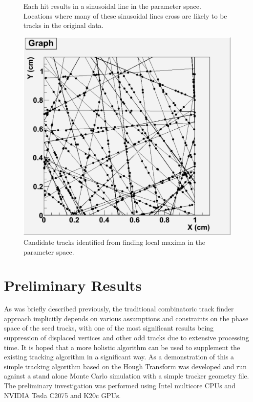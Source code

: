 \documentclass{JINST}
\begin{document}
\begin{figure}[!Hhtb]
\begin{minipage}[t]{4.9cm}
\begin{center}
	\caption{Each hit results in a sinusoidal line in the parameter space.  Locations where many 
of these sinusoidal lines cross are likely to be tracks in the original data.  \label{fig:accumulator}}
	\end{center}
\end{minipage}
\begin{minipage}[t]{4.9cm}
\begin{center}
	\includegraphics[width=1.\textwidth]{figs/50events_hits_tracks.pdf}
	\caption{Candidate tracks identified from finding local maxima in the parameter space.  \label{fig:tracks}}
	\end{center}
\end{minipage}
\end{figure}

\section{Preliminary Results}

As was briefly described previously, the traditional combinatoric track finder  approach implicitly depends on various assumptions and
constraints on the phase space of the seed tracks, with one of the most significant
results being suppression of displaced vertices and other odd tracks due to extensive processing time.
 It is hoped that a more holistic algorithm
can be used to supplement the existing tracking algorithm in a significant way.
As a demonstration of this a simple tracking algorithm based on the Hough Transform was developed 
and run against a stand alone Monte Carlo simulation with a simple tracker geometry file. 
The preliminary investigation was performed using Intel multicore CPUs and NVIDIA Tesla C2075 and K20c GPUs.
\end{document}
